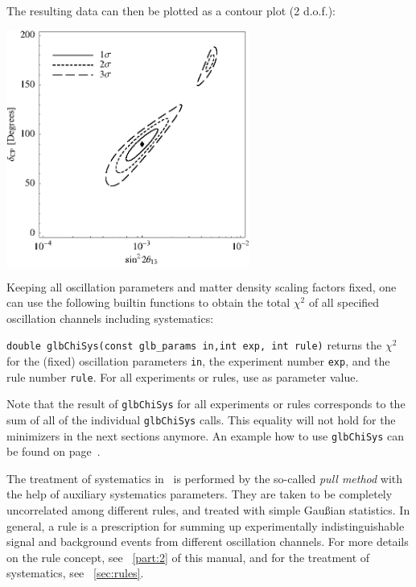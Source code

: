 {\vspace*{-0.4cm}

The resulting data can then be plotted as a contour plot (2 d.o.f.):
\begin{center}
\colorbox{white}{\includegraphics[width=8cm]{correx}}
\end{center}

}

Keeping all oscillation parameters and matter density scaling factors fixed,
 one can use the following builtin functions to obtain the total $\chi^2$ of all 
 specified oscillation channels including systematics:
\begin{function} 
{\tt double glbChiSys(const glb\_params in,int exp, int rule)} returns
the $\chi^2$ for the (fixed) oscillation parameters {\tt in}, the
experiment number {\tt exp}, and the rule number {\tt rule}. For all
experiments or rules, use  as parameter value.
\end{function}
Note that the result of {\tt glbChiSys} for all experiments or rules
corresponds to the sum of all of the individual {\tt glbChiSys} calls. 
This equality will not hold for the minimizers in the next sections anymore. 
 An example how to use  {\tt glbChiSys} can be found on page~\pageref{ex:corrth13dcp}.  

 
The treatment of systematics in \GLOBES\ is performed by the so-called
{\em pull method} with the help of auxiliary systematics parameters.
They are taken to be completely uncorrelated among different rules,
and treated with simple Gau\ss ian statistics.
In general, a rule is a prescription for summing up experimentally indistinguishable
signal and background events from different oscillation channels.
For more details on the rule concept, see \Part~\ref{part:2} of this manual,
and for the treatment of systematics, see \Sec~\ref{sec:rules}.
 
